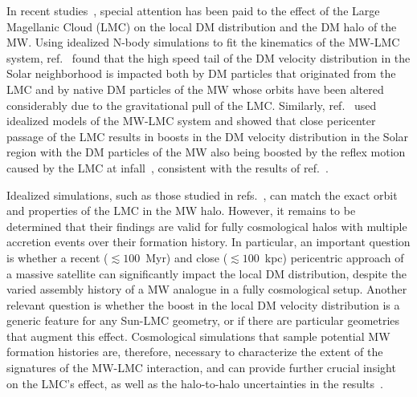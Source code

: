 In recent studies~\cite{Besla:2019xbx, Donaldson:2021byu, GaravitoCamargo:2021tcp, Garavito-Camargo:2020lqm, Conroy_2021, Petersen_2020,  Peterson_2020_MNRAS, Cunningham:2020nlo}, special attention has been paid to the effect of the Large Magellanic Cloud (LMC) on the local DM  distribution and the DM halo of the MW. Using idealized N-body simulations to fit the kinematics of the MW-LMC system, ref.~\cite{Besla:2019xbx} found that the high speed tail  of the DM velocity distribution in the Solar neighborhood is impacted both by DM particles that originated from the LMC and by native DM particles of the MW whose orbits have been altered considerably due to the gravitational pull of the LMC. 
Similarly, ref.~\cite{Donaldson:2021byu} used idealized models of the MW-LMC system and showed that close pericenter passage of the LMC  
results in boosts in the DM velocity distribution in the Solar region with the DM particles of the MW also being boosted by the reflex motion caused by the LMC at infall~\cite{Gomez:2014tda}, consistent with the results of ref.~\cite{Besla:2019xbx}. 



Idealized simulations, such as those studied in refs.~\cite{Donaldson:2021byu, Besla:2019xbx}, can match the exact orbit and properties of the LMC in the MW halo. However, it remains to be determined that their findings are valid for fully cosmological halos with multiple accretion events over their formation history. 
In particular, an important question is whether a recent ($ \lesssim 100$~Myr) and close ($\lesssim 100$~kpc) pericentric approach of a massive satellite can significantly impact  the local DM distribution, despite the varied assembly history of a MW analogue in a fully cosmological setup. 
Another relevant question is whether the boost in the local DM velocity distribution is a generic feature for any Sun-LMC geometry, or if there are  particular geometries that augment this effect. Cosmological simulations that sample potential MW formation histories are,  therefore, necessary to characterize  the extent of the signatures of the MW-LMC interaction, 
and can provide further crucial insight on the LMC's effect, as well as the halo-to-halo uncertainties in the results~\cite{Santos-Santos:2021yal}. 



 

